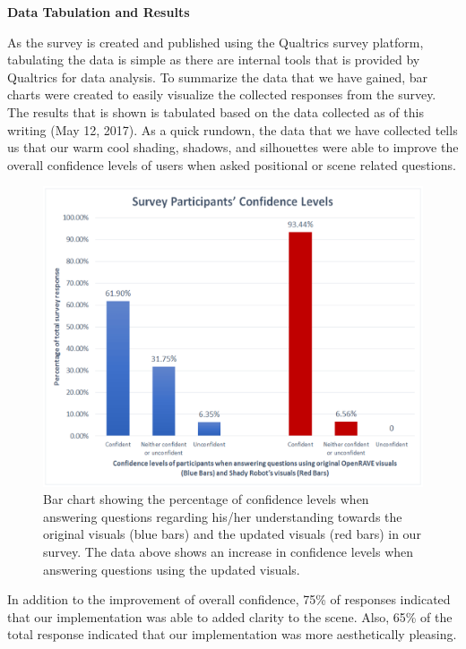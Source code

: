 \documentclass[10pt,journal,compsoc,draftclsnofoot]{IEEEtran}
\begin{document}
\begin{flushleft}
\newpage

\textbf{Data Tabulation and Results}
\par
As the survey is created and published using the Qualtrics survey platform, tabulating the data is simple as there are internal tools that is provided by Qualtrics for data analysis.
To summarize the data that we have gained, bar charts were created to easily visualize the collected responses from the survey.
The results that is shown is tabulated based on the data collected as of this writing (May 12, 2017).
As a quick rundown, the data that we have collected tells us that our warm cool shading, shadows, and silhouettes were able to improve the overall confidence levels of users when asked positional or scene related questions.

\begin{figure} [H]
  \includegraphics[scale=0.8]{ConfLevel.eps}
  \caption
{ \newline \hspace{\linewidth}
Bar chart showing the percentage of confidence levels when answering questions regarding his/her understanding towards the original visuals (blue bars) and the updated visuals (red bars) in our survey. The data above shows an increase in confidence levels when answering questions using the updated visuals.}
  \label{fig:conflevel}
\end{figure}

In addition to the improvement of overall confidence, 75\% of responses indicated that our implementation was able to added clarity to the scene.
Also, 65\% of the total response indicated that our implementation was more aesthetically pleasing.

\end{flushleft}
\end{document}
